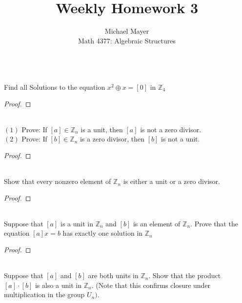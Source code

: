 \documentclass[12pt]{article}
\newcommand{\Z}{\mathbb{Z}}
\newenvironment{problem}[2][Problem]{\begin{trivlist}
\item[\hskip \labelsep {\bfseries #1}\hskip \labelsep {\bfseries #2.}]}{\end{trivlist}}
\begin{document}
\title{Weekly Homework 3}
\author{Michael Mayer\\ 
Math 4377: Algebraic Structures}

\maketitle
 
\begin{problem}{1}
\text{ }\\
Find all Solutions to the equation $x^{2} \oplus x = [0] $ in $\Z_{4}$
\end{problem}

\begin{proof}

\end{proof}
 
\begin{problem}{2}
\text{ }\\
$(1)$ Prove: If $[a] \in \Z_{n}$ is a unit, then $[a]$ is not a zero divisor.\\
$(2)$ Prove: If $[b] \in \Z_{n}$ is a zero divisor, then $[b]$ is not a unit.
\end{problem}

\begin{proof}

\end{proof}

\begin{problem}{3}
\text{ }\\
Show that every nonzero element of $\Z_{n}$ is either a unit or a zero divisor.
\end{problem}

\begin{proof}

\end{proof}

\begin{problem}{4}
\text{ }\\
Suppose that $[a]$ is a unit in $\Z_{n}$ and $[b]$ is an element of $\Z_{n}$. Prove that the equation $[a]x = b$ has exactly one solution in $\Z_{n}$
\end{problem}

\begin{proof}

\end{proof}

\begin{problem}{5}
\text{ }\\
Suppose that $[a]$ and $[b]$ are both units in $\Z_{n}$.  Show that the product $[a] \cdot [b]$ is also a unit in $\Z_{n}.$ (Note that this confirms closure under multiplication in the group $U_{n})$.
\end{problem}
\end{document}

